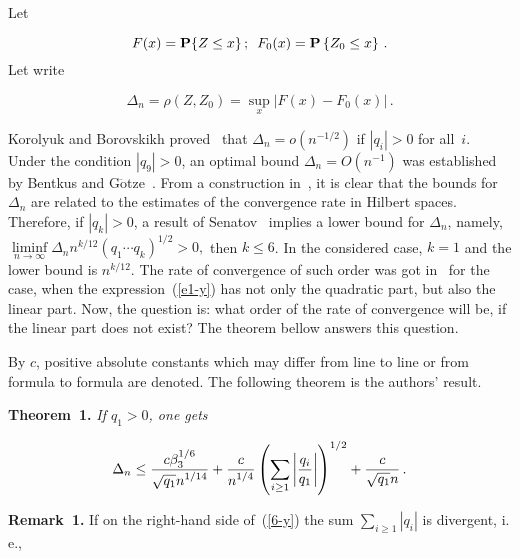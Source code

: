 \begin{multicols}{2}
    Let
    
    \noindent
    \begin{equation*}
    \label{o}
    F(x)=\mathbf{P}\{Z\leq x\}\,; \enskip F_0(x)=\mathbf{P}\left\{Z_0\leq x\right\}\,.
\end{equation*}
     Let write
     
     \noindent
     \begin{equation*}
    \Delta_{n}=\rho(Z,Z_0)=\sup\limits_{x}|F(x)-F_0(x)|\,.
    \end{equation*}

    Korolyuk and Borovskikh proved~\cite{3-y} 
    that $\Delta_{n}$\linebreak $ =o(n^{-1/2})$ if $|q_i| >0$ for all~$i$.
    Under the condition $|q_9| >0$, an optimal bound $\Delta_{n} =O(n^{-1})$ was established
    by Bentkus and G$\ddot{\mbox{o}}$tze~\cite{1-y}. From a construction in~\cite{1-y}, it is
    clear that the bounds for $\Delta_{n}$ are related to the estimates of
    the convergence rate in Hilbert spaces. Therefore, if $|q_k| >0$, a result of
    Senatov~\cite{6-y} implies a lower bound for $\Delta_{n}$, namely,
    $\liminf\limits_{n\rightarrow\infty}\Delta_{n}n^{k/12}(q_1\cdots q_k)^{1/2} >0,$ then $k \leq6$. 
    In the considered case, $k =1$ and the lower bound is $n^{k/12}$. The rate of convergence of such 
    order was got in~\cite{9-y} for the case, when the expression~(\ref{e1-y}) 
    has not only the quadratic part, but also the linear part. Now, the question is: 
    what order of the rate of convergence will be, if the linear part does not exist? 
    The theorem bellow answers this question.

    By $c$, positive absolute constants which may
    differ from line to line or from formula to formula are denoted. The 
    following theorem is the authors' result.
    
\smallskip

\noindent
\textbf{Theorem~1.} \textit{If $q_1>0$, one gets}

\noindent
   \begin{equation}\label{6-y}
    \Delta_{n}\leq \displaystyle\frac{\displaystyle c\beta_3^{1/6}\mathstrut}{\displaystyle \sqrt{q_1}n^{1/14}\mathstrut}+\displaystyle\frac{\displaystyle c\mathstrut}{\displaystyle n^{1/4}\mathstrut}
    \left(\sum\limits_{i\geq 1}\left\vert\displaystyle\frac{\displaystyle q_i\mathstrut}{\displaystyle q_1\mathstrut}\right\vert\right)^{1/2}+
    \displaystyle\frac{\displaystyle c\mathstrut}{\displaystyle \sqrt{q_1}n\mathstrut}\,.
    \end{equation}

\smallskip


\noindent
\textbf{Remark~1.} If on the right-hand side of~(\ref{6-y}) the sum $\sum\limits_{i \geq
    1}|q_i|$ is divergent, i.\,e.,
    

\end{multicols}
